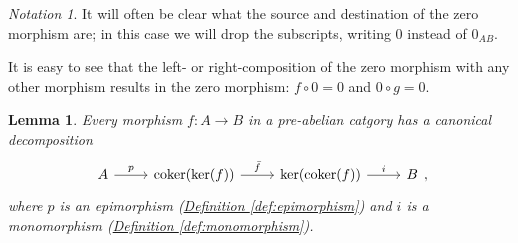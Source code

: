 \documentclass[a4paper,10pt]{scrreprt}
\newcommand{\coker}{\mathrm{coker}}
\theoremstyle{definition}
\theoremstyle{plain}
\newtheorem{lemma}{Lemma}[section]
\theoremstyle{remark}
\newtheorem{notation}{Notation}[section]
\begin{document}
\begin{notation}
  It will often be clear what the source and destination of the zero morphism are; in this case we will drop the subscripts, writing $0$ instead of $0_{AB}$.
\end{notation}

It is easy to see that the left- or right-composition of the zero morphism with any other morphism results in the zero morphism: $f \circ 0 = 0$ and $0 \circ g = 0$.

\begin{lemma}
  \label{lemma:everymorphisminapreabeliancategoryfactors}
  Every morphism $f\colon A \to B$ in a pre-abelian catgory has a canonical decomposition
  \begin{equation*}
    \begin{tikzcd}
      A 
      \arrow[r, "p"]
      & \coker(\ker(f))
      \arrow[r, "\bar{f}"]
      & \ker(\coker(f))
      \arrow[r, "i"]
      & B
    \end{tikzcd},
  \end{equation*}
  where $p$ is an epimorphism (\hyperref[def:epimorphism]{Definition \ref*{def:epimorphism}}) and $i$ is a monomorphism (\hyperref[def:monomorphism]{Definition \ref*{def:monomorphism}}).
\end{lemma}
\end{document}

